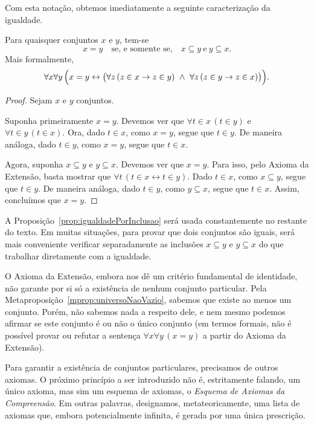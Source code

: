 Com esta notação, obtemos imediatamente a seguinte caracterização da igualdade.

\begin{proposition} [$\BST$]\label{prop:igualdadePorInclusao}
Para quaisquer conjuntos $x$ e $y$, tem-se
\[
x = y \quad \text{se, e somente se,} \quad x \subseteq y \ \text{e} \ y \subseteq x.
\]
Mais formalmente,
\[
\forall x \forall y\, \Bigl(x = y \leftrightarrow \bigl(\forall z\, (z \in x \rightarrow z \in y)\ \land\ \forall z\, (z \in y \rightarrow z \in x)\bigr)\Bigr).
\]
\end{proposition}

\begin{proof}
    Sejam $x$ e $y$ conjuntos.
    
    Suponha primeiramente $x = y$.
    Devemos ver que $\forall t \in x\, (t \in y)$ e $\forall t \in y\, (t \in x)$.
    Ora, dado $t \in x$, como $x = y$, segue que $t \in y$.
    De maneira análoga, dado $t \in y$, como $x = y$, segue que $t \in x$.

    Agora, suponha $x \subseteq y$ e $y \subseteq x$.
    Devemos ver que $x = y$.
    Para isso, pelo Axioma da Extensão, basta mostrar que $\forall t\, (t \in x \leftrightarrow t \in y)$.
    Dado $t \in x$, como $x \subseteq y$, segue que $t \in y$.
    De maneira análoga, dado $t \in y$, como $y \subseteq x$, segue que $t \in x$.
    Assim, concluímos que $x = y$.
\end{proof}

A Proposição~\ref{prop:igualdadePorInclusao} será usada constantemente no restante do texto.
Em muitas situações, para provar que dois conjuntos são iguais, será mais conveniente verificar separadamente as inclusões $x \subseteq y$ e $y \subseteq x$ do que trabalhar diretamente com a igualdade.

O Axioma da Extensão, embora nos dê um critério fundamental de identidade, não garante por si só a existência de nenhum conjunto particular.
Pela Metaproposição~\ref{mprop:universoNaoVazio}, sabemos que existe ao menos um conjunto.
Porém, não sabemos nada a respeito dele, e nem mesmo podemos afirmar se este conjunto é ou não o único conjunto (em termos formais, não é possível provar ou refutar a sentença $\forall x \forall y\, (x = y)$ a partir do Axioma da Extensão).

Para garantir a existência de conjuntos particulares, precisamos de outros axiomas.
O próximo princípio a ser introduzido não é, estritamente falando, um único axioma, mas sim um esquema de axiomas, o \emph{Esquema de Axiomas da Compreensão}.
Em outras palavras, designamos, metateoricamente, uma lista de axiomas que, embora potencialmente infinita, é gerada por uma única prescrição.


